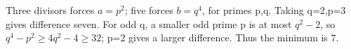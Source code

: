 Three divisors forces $a=p^2$; five forces $b=q^4$, for primes p,q. Taking q=2,p=3 gives difference seven. For odd q, a smaller odd prime p is at most $q^2-2$, so $q^4-p^2\ge4q^2-4\ge32$; p=2 gives a larger difference. Thus the minimum is $\boxed7$.
